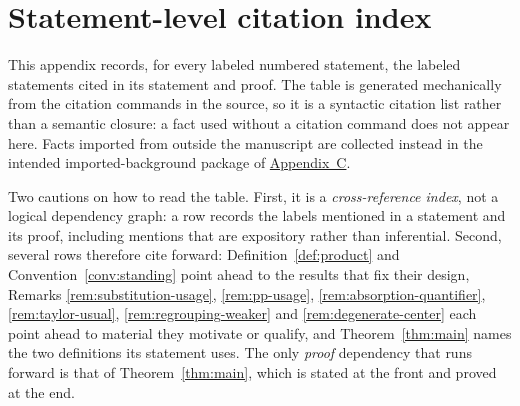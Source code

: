 \documentclass[11pt]{article}
\theoremstyle{mainplain}
\theoremstyle{mainroman}
\theoremstyle{definition}
\numberwithin{equation}{section}
\begin{document}
\appendix

\section{Statement-level citation index}\label{app:dependency-graph}

This appendix records, for every labeled numbered statement, the labeled
statements cited in its statement and proof. The table is generated
mechanically from the citation commands in the source, so it is a syntactic
citation list rather than a semantic closure: a fact used without a citation
command does not appear here. Facts imported from outside the manuscript are
collected instead in the intended imported-background package of
\hyperref[app:background]{Appendix~C}.

Two cautions on how to read the table. First, it is a \emph{cross-reference
index}, not a logical dependency graph: a row records the labels mentioned in a
statement and its proof, including mentions that are expository rather than
inferential. Second, several rows therefore cite forward:
Definition~\ref{def:product} and Convention~\ref{conv:standing} point ahead to
the results that fix their design, Remarks \ref{rem:substitution-usage},
\ref{rem:pp-usage}, \ref{rem:absorption-quantifier}, \ref{rem:taylor-usual},
\ref{rem:regrouping-weaker} and \ref{rem:degenerate-center} each point ahead to
material they motivate or qualify, and Theorem~\ref{thm:main} names the two
definitions its statement uses. The only \emph{proof} dependency that runs
forward is that of Theorem~\ref{thm:main}, which is stated at the front and
proved at the end.
\end{document}
